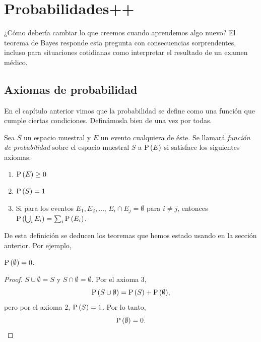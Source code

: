 \chapter{Probabilidades++}

\begin{ideanote}
¿Cómo debería cambiar lo que creemos cuando aprendemos algo nuevo? El teorema de Bayes responde esta pregunta con consecuencias sorprendentes, incluso para situaciones cotidianas como interpretar el resultado de un examen médico.
\end{ideanote}

\formal
\section{Axiomas de probabilidad}

En el capítulo anterior vimos que la probabilidad se define como una función que cumple ciertas condiciones. Definámosla bien de una vez por todas.
\begin{definition}[Probabilidad]
Sea \(S\) un espacio muestral y \(E\) un evento cualquiera de éste. Se llamará \emph{función de probabilidad} sobre el espacio muestral \(S\) a \(\operatorname{P}{(E)}\) si satisface los siguientes axiomas:
\begin{enumerate}
    \item \(\operatorname{P}{(E)} \geq 0\)
    \item \(\operatorname{P}{(S)} = 1\)
    \item Si para los eventos \(E_1, E_2, \ldots\), \(E_i \cap E_j = \emptyset\) para \(i \neq j\), entonces \(\operatorname{P}{\left(\bigcup_{i} E_i\right)} = \sum_{i} \operatorname{P}{(E_i)}\).
\end{enumerate}
\end{definition}

De esta definición se deducen los teoremas que hemos estado usando en la sección anterior. Por ejemplo, 
\begin{theorem}
    \(\operatorname{P}{(\emptyset)} = 0\).
\end{theorem}

\begin{proof}
    \(S \cup \emptyset = S\) y \(S \cap \emptyset = \emptyset\). Por el axioma 3, \[\operatorname{P}{(S\cup \emptyset)} = \operatorname{P}{(S)} + \operatorname{P}{(\emptyset)},\] pero por el axioma 2, \(\operatorname{P}{(S)} = 1\). Por lo tanto, \[\operatorname{P}{(\emptyset)} = 0.\]
\end{proof}

\informal

